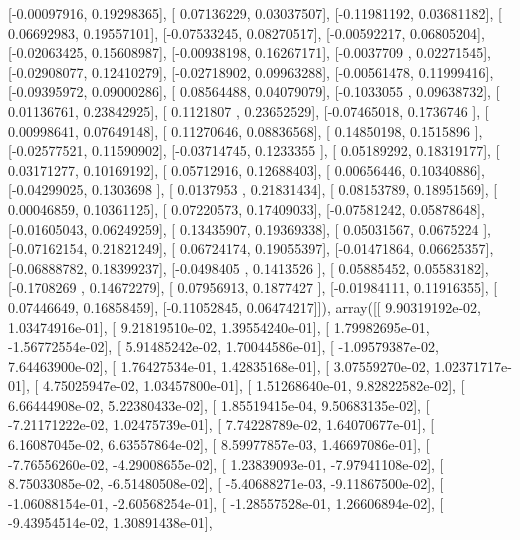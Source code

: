 \documentclass{article}
\begin{document}
       [-0.00097916,  0.19298365],
       [ 0.07136229,  0.03037507],
       [-0.11981192,  0.03681182],
       [ 0.06692983,  0.19557101],
       [-0.07533245,  0.08270517],
       [-0.00592217,  0.06805204],
       [-0.02063425,  0.15608987],
       [-0.00938198,  0.16267171],
       [-0.0037709 ,  0.02271545],
       [-0.02908077,  0.12410279],
       [-0.02718902,  0.09963288],
       [-0.00561478,  0.11999416],
       [-0.09395972,  0.09000286],
       [ 0.08564488,  0.04079079],
       [-0.1033055 ,  0.09638732],
       [ 0.01136761,  0.23842925],
       [ 0.1121807 ,  0.23652529],
       [-0.07465018,  0.1736746 ],
       [ 0.00998641,  0.07649148],
       [ 0.11270646,  0.08836568],
       [ 0.14850198,  0.1515896 ],
       [-0.02577521,  0.11590902],
       [-0.03714745,  0.1233355 ],
       [ 0.05189292,  0.18319177],
       [ 0.03171277,  0.10169192],
       [ 0.05712916,  0.12688403],
       [ 0.00656446,  0.10340886],
       [-0.04299025,  0.1303698 ],
       [ 0.0137953 ,  0.21831434],
       [ 0.08153789,  0.18951569],
       [ 0.00046859,  0.10361125],
       [ 0.07220573,  0.17409033],
       [-0.07581242,  0.05878648],
       [-0.01605043,  0.06249259],
       [ 0.13435907,  0.19369338],
       [ 0.05031567,  0.0675224 ],
       [-0.07162154,  0.21821249],
       [ 0.06724174,  0.19055397],
       [-0.01471864,  0.06625357],
       [-0.06888782,  0.18399237],
       [-0.0498405 ,  0.1413526 ],
       [ 0.05885452,  0.05583182],
       [-0.1708269 ,  0.14672279],
       [ 0.07956913,  0.1877427 ],
       [-0.01984111,  0.11916355],
       [ 0.07446649,  0.16858459],
       [-0.11052845,  0.06474217]]), array([[  9.90319192e-02,   1.03474916e-01],
       [  9.21819510e-02,   1.39554240e-01],
       [  1.79982695e-01,  -1.56772554e-02],
       [  5.91485242e-02,   1.70044586e-01],
       [ -1.09579387e-02,   7.64463900e-02],
       [  1.76427534e-01,   1.42835168e-01],
       [  3.07559270e-02,   1.02371717e-01],
       [  4.75025947e-02,   1.03457800e-01],
       [  1.51268640e-01,   9.82822582e-02],
       [  6.66444908e-02,   5.22380433e-02],
       [  1.85519415e-04,   9.50683135e-02],
       [ -7.21171222e-02,   1.02475739e-01],
       [  7.74228789e-02,   1.64070677e-01],
       [  6.16087045e-02,   6.63557864e-02],
       [  8.59977857e-03,   1.46697086e-01],
       [ -7.76556260e-02,  -4.29008655e-02],
       [  1.23839093e-01,  -7.97941108e-02],
       [  8.75033085e-02,  -6.51480508e-02],
       [ -5.40688271e-03,  -9.11867500e-02],
       [ -1.06088154e-01,  -2.60568254e-01],
       [ -1.28557528e-01,   1.26606894e-02],
       [ -9.43954514e-02,   1.30891438e-01],
\end{document}
